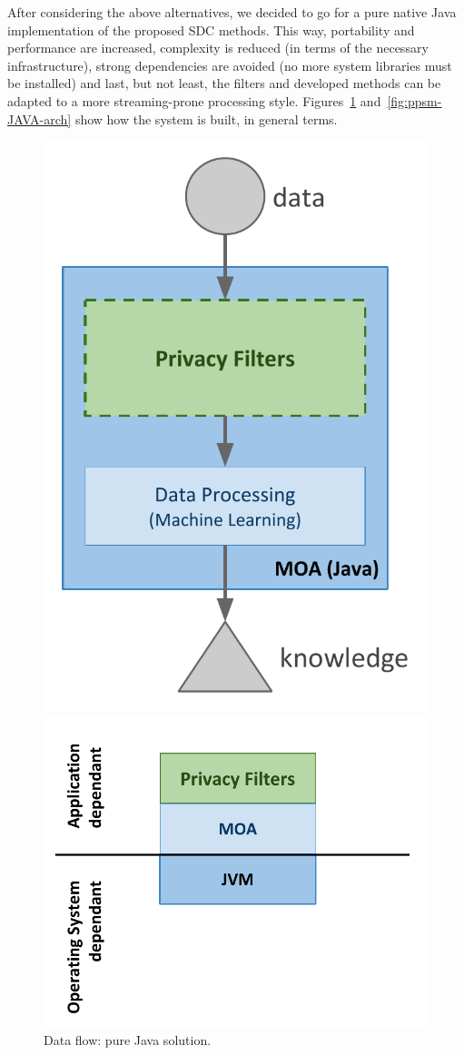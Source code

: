 After considering the above alternatives, we decided to go for a pure native Java implementation of the proposed SDC methods. This way, portability and performance are increased, complexity is reduced (in terms of the necessary infrastructure), strong dependencies are avoided (no more system libraries must be installed) and last, but not least, the filters and developed methods can be adapted to a more streaming-prone processing style. Figures~\ref{fig:ppsm-JAVA} and~\ref{fig:ppsm-JAVA-arch} show how the system is built, in general terms.

\begin{figure}[h]
	\centering
	\begin{minipage}[t]{.45\textwidth}
		\centering
		\includegraphics[width=.7\textwidth]{figures/moa-ppsm-JAVA.pdf}
		\caption{Data flow: pure Java solution.}
		\label{fig:ppsm-JAVA}
	\end{minipage}\hfill
	\begin{minipage}[t]{.45\textwidth}
		\centering
		\includegraphics[width=1.0\textwidth]{figures/moa-ppsm-JAVA-arch.pdf}

\end{minipage}
\end{figure}
